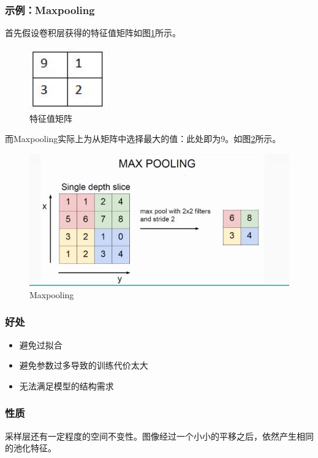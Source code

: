 \documentclass[UTF8]{ctexart}
\begin{document}
\subsubsection{示例：Maxpooling}
首先假设卷积层获得的特征值矩阵如图\ref{maxpooling1}所示。
\begin{figure}[htb]
	\centering
	\includegraphics[width=0.3\textwidth]{figures/maxpooling1.jpg}
	\caption{特征值矩阵}
	\label{maxpooling1}
\end{figure}
\par 而Maxpooling实际上为从矩阵中选择最大的值：此处即为9。如图\ref{maxpooling2}所示。
\begin{figure}[htb]
	\centering
	\includegraphics[width=1.0\textwidth]{figures/maxpooling2.jpg}
	\caption{Maxpooling}
	\label{maxpooling2}
\end{figure}
\subsubsection{好处}
\begin{itemize}
	\item 避免过拟合
	\item 避免参数过多导致的训练代价太大
	\item 无法满足模型的结构需求
\end{itemize}
\subsubsection{性质}
采样层还有一定程度的空间不变性。图像经过一个小小的平移之后，依然产生相同的池化特征。
\end{document}

